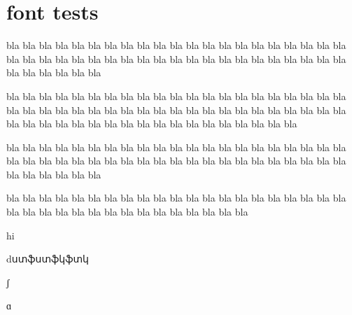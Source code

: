 \section{font tests}
bla bla bla bla bla bla bla bla bla bla bla bla
bla bla bla bla bla bla bla bla bla bla bla bla
bla bla bla bla bla bla bla bla bla bla bla bla
bla bla bla bla bla bla bla bla bla bla bla bla

bla bla bla bla bla bla bla bla bla bla bla bla
bla bla bla bla bla bla bla bla bla bla bla bla
bla bla bla bla bla bla bla bla bla bla bla bla
bla bla bla bla bla bla bla bla bla bla bla bla
bla bla bla bla bla bla bla bla bla bla bla bla


bla bla bla bla bla bla bla bla bla bla bla bla
bla bla bla bla bla bla bla bla bla bla bla bla
bla bla bla bla bla bla bla bla bla bla bla bla
bla bla bla bla bla bla bla bla bla bla bla bla

bla bla bla bla bla bla bla bla bla bla bla bla
bla bla bla bla bla bla bla bla bla bla bla bla
bla bla bla bla bla bla bla bla bla bla bla bla




hi

dստֆստֆկֆտկ

ʃ

ɑ
